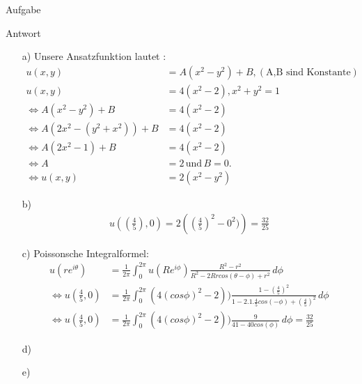\documentclass{scrartcl}
\begin{document}
\begin{section}{Aufgabe}
\begin{subsection}{Antwort}
\begin{itemize}
\item[a)]Unsere Ansatzfunktion lautet :\\
\begin{align*}
   u(x,y) &= A(x^{2}-y^{2})+B,( \textrm{A,B sind Konstante})\\
    u(x,y) &= 4(x^{2}-2) , x^{2}+y^{2}=1\\
    \Leftrightarrow A(x^{2}-y^{2})+B&=4(x^{2}-2)\\
    \Leftrightarrow A(2x^{2}-(y^{2}+x^{2}))+B&=4(x^{2}-2)\\
    \Leftrightarrow A(2x^{2}-1)+B&=4(x^{2}-2)\\
    \Leftrightarrow A&=2\, \textrm{und}\, B=0.\\
    \Leftrightarrow u(x,y)&=2(x^{2}-y^{2})
\end{align*}
\item[b)]
\begin{align*}
u((\frac{4}{5}),0)=2\left((\frac{4}{5})^{2}-0^{2})\right)=\frac{32}{25}
\end{align*}
\item[c)] 
Poissonsche Integralformel:\\
\begin{align*}
       u(re^{i\theta})&=\frac{1}{2\pi} \int_{0}^{2\pi}u(Re^{i\phi})\frac{R^{2}-r^{2}}{R^{2}-2Rrcos(\theta-\phi)+r^{2}}\,d\phi \\
    \Leftrightarrow u\left(\frac{4}{5},0\right)&=
   \frac{1}{2\pi} \int_{0}^{2\pi}(4(cos\phi)^{2}-2))\frac{1-(\frac{4}{5})^{2}}{1-2.1.\frac{4}{5}cos(-\phi)+(\frac{4}{5})^{2}}\,d\phi \\
    \Leftrightarrow  u\left(\frac{4}{5},0\right)&=\frac{1}{2\pi} \int_{0}^{2\pi}(4(cos\phi)^{2}-2))\frac{9}{41-40cos(\phi)}\,d\phi = \frac{32}{25}
\end{align*}
\item[d)] 
\item[e)] 
\end{itemize}
    \end{subsection}  
\end{section}
\end{document}
